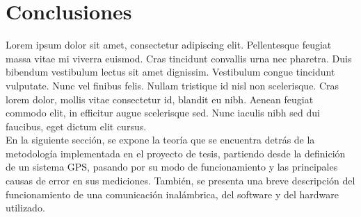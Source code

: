 \section{Conclusiones}

Lorem ipsum dolor sit amet, consectetur adipiscing elit. Pellentesque feugiat massa vitae mi viverra euismod. Cras tincidunt convallis urna nec pharetra. Duis bibendum vestibulum lectus sit amet dignissim. Vestibulum congue tincidunt vulputate. Nunc vel finibus felis. Nullam tristique id nisl non scelerisque. Cras lorem dolor, mollis vitae consectetur id, blandit eu nibh. Aenean feugiat commodo elit, in efficitur augue scelerisque sed. Nunc iaculis nibh sed dui faucibus, eget dictum elit cursus. \\

En la siguiente sección, se expone la teoría que se encuentra detrás de la metodología implementada en el proyecto de tesis, partiendo desde la definición de un sistema GPS, pasando por su modo de funcionamiento y las principales causas de error en sus mediciones. También, se presenta una breve descripción del funcionamiento de una comunicación inalámbrica, del software y del hardware utilizado.
